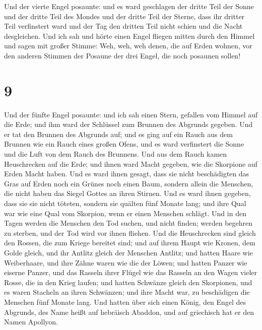  Und der vierte Engel posaunte: und es ward geschlagen
der dritte Teil der Sonne und der dritte Teil des Mondes und der dritte
Teil der Sterne, dass ihr dritter Teil verfinstert ward und der Tag den
dritten Teil nicht schien und die Nacht desgleichen.  Und
ich sah und hörte einen Engel fliegen mitten durch den Himmel und sagen
mit großer Stimme: Weh, weh, weh denen, die auf Erden wohnen, vor den
anderen Stimmen der Posaune der drei Engel, die noch posaunen sollen!

\hypertarget{section-8}{%
\section{9}\label{section-8}}

 Und der fünfte Engel posaunte: und ich sah einen Stern,
gefallen vom Himmel auf die Erde; und ihm ward der Schlüssel zum Brunnen
des Abgrunds gegeben.  Und er tat den Brunnen des Abgrunds
auf; und es ging auf ein Rauch aus dem Brunnen wie ein Rauch eines
großen Ofens, und es ward verfinstert die Sonne und die Luft von dem
Rauch des Brunnens.  Und aus dem Rauch kamen Heuschrecken
auf die Erde; und ihnen ward Macht gegeben, wie die Skorpione auf Erden
Macht haben.  Und es ward ihnen gesagt, dass sie nicht
beschädigten das Gras auf Erden noch ein Grünes noch einen Baum, sondern
allein die Menschen, die nicht haben das Siegel Gottes an ihren Stirnen.
 Und es ward ihnen gegeben, dass sie sie nicht töteten,
sondern sie quälten fünf Monate lang; und ihre Qual war wie eine Qual
vom Skorpion, wenn er einen Menschen schlägt.  Und in den
Tagen werden die Menschen den Tod suchen, und nicht finden; werden
begehren zu sterben, und der Tod wird vor ihnen fliehen. 
Und die Heuschrecken sind gleich den Rossen, die zum Kriege bereitet
sind; und auf ihrem Haupt wie Kronen, dem Golde gleich, und ihr Antlitz
gleich der Menschen Antlitz;  und hatten Haare wie
Weiberhaare, und ihre Zähne waren wie die der Löwen;  und
hatten Panzer wie eiserne Panzer, und das Rasseln ihrer Flügel wie das
Rasseln an den Wagen vieler Rosse, die in den Krieg laufen;
 und hatten Schwänze gleich den Skorpionen, und es waren
Stacheln an ihren Schwänzen; und ihre Macht war, zu beschädigen die
Menschen fünf Monate lang.  Und hatten über sich einen
König, den Engel des Abgrunds, des Name heißt auf hebräisch Abaddon, und
auf griechisch hat er den Namen Apollyon.

